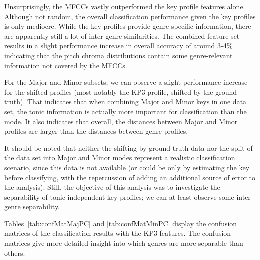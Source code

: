 \documentclass{article}
\begin{document}
Unsurprisingly, the MFCCs vastly outperformed the key profile features alone. Although not random, the overall classification performance given the key profiles is only mediocre. While the key profiles provide genre-specific information, there are apparently still a lot of inter-genre similarities. The combined feature set results in a slight performance increase in overall accuracy of around 3-4\% indicating that the pitch chroma distributions contain some genre-relevant information not covered by the MFCCs. 

For the Major and Minor subsets, we can observe a slight performance increase for the shifted profiles (most notably the KP3 profile, shifted by the ground truth). That indicates that when combining Major and Minor keys in one data set, the tonic information is actually more important for classification than the mode. It also indicates that overall, the distances between Major and Minor profiles are larger than the distances between genre profiles. 

It should be noted that neither the shifting by ground truth data nor the split of the data set into Major and Minor modes represent a realistic classification scenario, since this data is not available (or could be only by estimating the key before classifying, with the repercussion of adding an additional source of error to the analysis). 
Still, the objective of this analysis was to investigate the separability of tonic independent key profiles; we can at least observe some inter-genre separability.



Tables~\ref{tab:confMatMajPC} and \ref{tab:confMatMinPC} display the confusion matrices of the classification results with the KP3 features. The confusion matrices give more detailed insight into which genres are more separable than others. %
\end{document}
